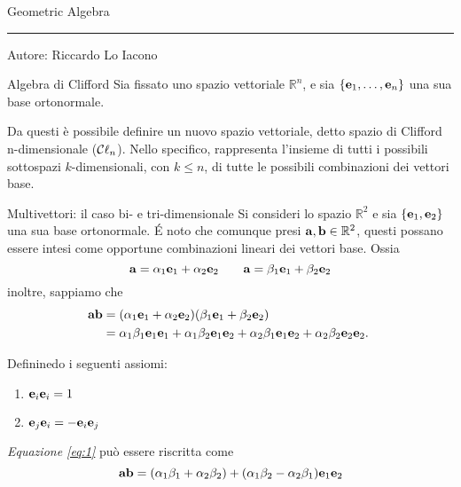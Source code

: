 \begin{frame}
    \Huge Geometric Algebra
    \rule{\textwidth}{.25pt}
    \small{Autore: Riccardo Lo Iacono}
\end{frame}
\begin{frame}{Algebra di Clifford}
    Sia fissato uno spazio vettoriale \(\mathbb{R}^{n}\), e sia 
    \(\{\mathbf{e}_{1}, \ldots, \mathbf{e}_{n}\}\) una sua base ortonormale.

    Da questi è possibile definire un nuovo spazio vettoriale,
    detto spazio di Clifford n-dimensionale (\(\Clifford\)).
    Nello specifico, \Clifford rappresenta l'insieme di tutti i 
    possibili sottospazi \(k\)-dimensionali, con \(k \le n\), 
    di tutte le possibili combinazioni dei vettori base.
\end{frame}
\begin{frame}{Multivettori: il caso bi- e tri-dimensionale}
    Si consideri lo spazio \(\mathbb{R}^{2}\) e sia \(\{\mathbf{e}_{1}, 
    \mathbf{e}_{2}\}\) una sua base ortonormale. 
    \'E noto che comunque presi \(\mathbf{a}, \mathbf{b} \in \mathbb{R}^{2}\),
    questi possano essere intesi come opportune combinazioni lineari dei vettori 
    base. Ossia
    \[
        \mathbf{a} = \alpha_{1}\mathbf{e}_{1} + \alpha_{2}\mathbf{e}_{2} 
        \qquad \mathbf{a} = \beta_{1}\mathbf{e}_{1} + \beta_{2}\mathbf{e}_{2}
    \]
    inoltre, sappiamo che 
    \begin{equation}\label{eq:1}
        \begin{aligned}
        \mathbf{ab} & = 
            (\alpha_{1}\mathbf{e}_{1} + \alpha_{2}\mathbf{e}_{2})
            (\beta_{1}\mathbf{e}_{1} + \beta_{2}\mathbf{e}_{2}) \\
            & = \alpha_{1}\beta_{1}\mathbf{e}_{1}\mathbf{e}_{1} +
                \alpha_{1}\beta_{2}\mathbf{e}_{1}\mathbf{e}_{2} +
                \alpha_{2}\beta_{1}\mathbf{e}_{1}\mathbf{e}_{2} + 
                \alpha_{2}\beta_{2}\mathbf{e}_{2}\mathbf{e}_{2}.
        \end{aligned}\
    \end{equation}
\end{frame}
\begin{frame}
    Defininedo i seguenti assiomi:
    \begin{enumerate}
        \item \(\mathbf{e}_{i}\mathbf{e}_{i} = 1\)
        \item \(\mathbf{e}_{j}\mathbf{e}_{i} = - \mathbf{e}_{i}\mathbf{e}_{j}\)
    \end{enumerate}
    \emph{Equazione \eqref{eq:1}} può essere riscritta come 
    \begin{equation}\label{eq:2}
        \mathbf{ab} = (\alpha_{1}\beta_{1} + \alpha_{2}\beta_{2}) + 
            (\alpha_{1}\beta_{2} - \alpha_{2}\beta_{1})\mathbf{e}_{1}\mathbf{e}_{2}
    \end{equation}
\end{frame}
